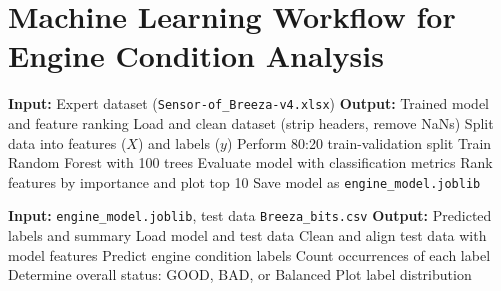 \section{Machine Learning Workflow for Engine Condition Analysis}

\begin{algorithm}[H]
\caption{Training and Evaluation of Classification Model}
\begin{algorithmic}[1]
\State \textbf{Input:} Expert dataset (\texttt{Sensor-of\_Breeza-v4.xlsx})
\State \textbf{Output:} Trained model and feature ranking
\State Load and clean dataset (strip headers, remove NaNs)
\State Split data into features ($X$) and labels ($y$)
\State Perform 80:20 train-validation split
\State Train Random Forest with 100 trees
\State Evaluate model with classification metrics
\State Rank features by importance and plot top 10
\State Save model as \texttt{engine\_model.joblib}
\end{algorithmic}
\end{algorithm}

\begin{algorithm}[H]
\caption{Prediction and Engine Condition Summary}
\begin{algorithmic}[1]
\State \textbf{Input:} \texttt{engine\_model.joblib}, test data \texttt{Breeza\_bits.csv}
\State \textbf{Output:} Predicted labels and summary
\State Load model and test data
\State Clean and align test data with model features
\State Predict engine condition labels
\State Count occurrences of each label
\State Determine overall status: GOOD, BAD, or Balanced
\State Plot label distribution
\end{algorithmic}
\end{algorithm}

        
